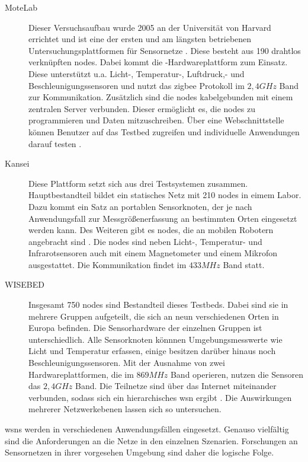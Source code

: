 \begin{description}

\item[MoteLab] Dieser Versuchsaufbau wurde 2005 an der Universität von Harvard errichtet und ist eine der ersten und am längsten betriebenen Untersuchungsplattformen für Sensornetze \citep{survey}. Diese besteht aus 190 drahtlos verknüpften \glspl{node}. Dabei kommt die -Hardwareplattform zum Einsatz. Diese unterstützt u.a. Licht-, Temperatur-, Luftdruck,- und Beschleunigungssensoren und nutzt das \gls{zigbee} Protokoll im $2,4GHz$ Band zur Kommunikation. Zusätzlich sind die \glspl{node} kabelgebunden mit einem zentralen Server verbunden. Dieser ermöglicht es, die \glspl{node} zu programmieren und Daten mitzuschreiben. Über eine Webschnittstelle können Benutzer auf das Testbed zugreifen und individuelle Anwendungen darauf testen \cite{Motelab}.

\item[Kansei] Diese Plattform setzt sich aus drei Testsystemen zusammen. Hauptbestandteil bildet ein statisches Netz mit 210 \glspl{node} in eimem Labor. Dazu kommt ein Satz an portablen Sensorknoten, der je nach Anwendungsfall zur Messgrößenerfassung an bestimmten Orten eingesetzt werden kann. Des Weiteren gibt es \glspl{node}, die an mobilen Robotern angebracht sind \cite{Kansei}. Die \glspl{node} sind neben Licht-, Temperatur- und Infrarotsensoren auch mit einem Magnetometer und einem Mikrofon ausgestattet. Die Kommunikation findet im $433MHz$ Band statt.

\item[WISEBED] Insgesamt 750 \glspl{node} sind Bestandteil dieses Testbeds. Dabei sind sie in mehrere Gruppen aufgeteilt, die sich an neun verschiedenen Orten in Europa befinden. Die Sensorhardware der einzelnen Gruppen ist unterschiedlich. Alle Sensorknoten könnnen Umgebungsmesswerte wie Licht und Temperatur erfassen, einige besitzen darüber hinaus noch Beschleunigungssensoren. Mit der Ausnahme von zwei Hardwareplattformen, die im $869 MHz$ Band operieren, nutzen die Sensoren das $2,4 GHz$ Band. Die Teilnetze sind über das Internet miteinander verbunden, sodass sich ein hierarchisches \acs{wsn} ergibt \cite{WISEBED}. Die Auswirkungen mehrerer Netzwerkebenen lassen sich so untersuchen.

\end{description}
 \acp{wsn} werden in  verschiedenen Anwendungsfällen eingesetzt. Genauso vielfältig sind die Anforderungen an die Netze in den einzelnen Szenarien. Forschungen an Sensornetzen in ihrer vorgesehen Umgebung sind daher die logische Folge.
